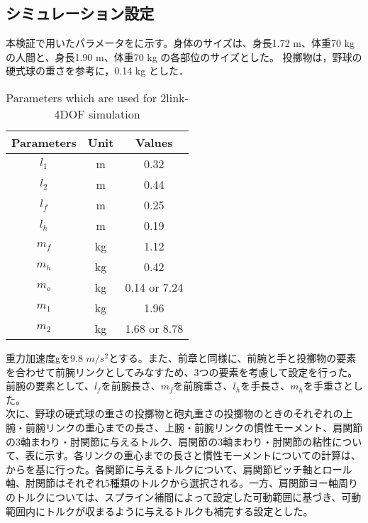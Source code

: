 \subsection{シミュレーション設定}
本検証で用いたパラメータをに示す。身体のサイズは、身長1.72 m、体重70 kgの人間と、身長1.90 m、体重70 kg の各部位のサイズとした。
投擲物は，野球の硬式球の重さを参考に，0.14 kg とした．
\begin{table}[tb]
  \begin{center}
    \caption{Parameters which are used for 2link-4DOF simulation}

    \begin{tabular}{c c c}
      \hline
      Parameters & Unit & Values \\
      \hline
      $l_{1}$ & m & 0.32 \\
      $l_{2}$ & m & 0.44 \\
      $l_{f}$ & m & 0.25 \\
      $l_{h}$ & m & 0.19 \\
      $m_{f}$ & kg & 1.12 \\
      $m_{h}$ & kg & 0.42 \\
      $m_{o}$ & kg & 0.14 or 7.24 \\
      $m_{1}$ & kg & 1.96 \\
      $m_{2}$ & kg & 1.68 or 8.78 \\
      \hline
    \end{tabular}
  \end{center}
\end{table}

重力加速度gを9.8 $m/s^{2}$とする。また、前章と同様に、前腕と手と投擲物の要素を合わせて前腕リンクとしてみなすため、3つの要素を考慮して設定を行った。
前腕の要素として、$l_{f}$を前腕長さ、$m_{f}$を前腕重さ、$l_{h}$を手長さ、$m_{h}$を手重さとした。\\

次に、野球の硬式球の重さの投擲物と砲丸重さの投擲物のときのそれぞれの上腕・前腕リンクの重心までの長さ、上腕・前腕リンクの慣性モーメント、肩関節の3軸まわり・肘関節に与えるトルク、肩関節の3軸まわり・肘関節の粘性について、表に示す。各リンクの重心までの長さと慣性モーメントについての計算は、からを基に行った。各関節に与えるトルクについて、肩関節ピッチ軸とロール軸、肘関節はそれぞれ5種類のトルクから選択される。一方、肩関節ヨー軸周りのトルクについては、スプライン補間によって設定した可動範囲に基づき、可動範囲内にトルクが収まるように与えるトルクも補完する設定とした。

